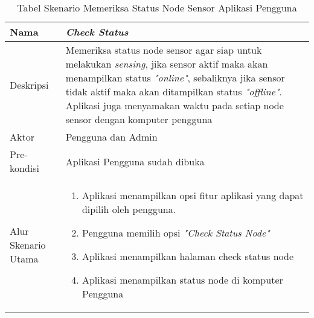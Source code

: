     \begin{table}[H]
        \centering
        \caption{Tabel Skenario Memeriksa Status Node Sensor Aplikasi Pengguna}
        \begin{tabular}{|p{3cm}|p{10cm}|}
        \hline
            Nama & \textit{Check Status}\\
        \hline 
        \hline
            Deskripsi & Memeriksa status node sensor agar siap untuk melakukan \textit{sensing}, jika sensor aktif maka akan menampilkan status \textit{"online"}, sebaliknya jika sensor tidak aktif maka akan ditampilkan status \textit{"offline"}. Aplikasi juga menyamakan waktu pada setiap node sensor dengan komputer pengguna\\
        \hline
            Aktor & Pengguna dan Admin\\
        \hline
            Pre-kondisi & Aplikasi Pengguna sudah dibuka\\
        \hline
            Alur Skenario Utama & 
             \begin{enumerate}
                \item Aplikasi menampilkan opsi fitur aplikasi yang dapat dipilih oleh pengguna.
                
                \item Pengguna memilih opsi \textit{"Check Status Node"}
                
                \item Aplikasi menampilkan halaman check status node
                
                \item Aplikasi menampilkan status node di komputer Pengguna
                
                
            \end{enumerate}\\
            \hline
        \end{tabular}
        \label{tab:skenario4}
    \end{table}
    
